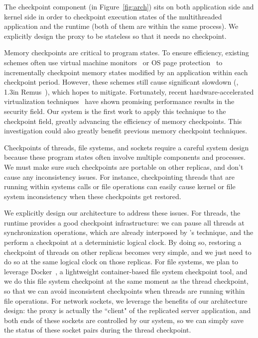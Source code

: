 The \crane checkpoint component (in Figure~\ref{fig:arch}) sits on both
application side and kernel side in order to checkpoint execution states of the
multithreaded application and the \smt runtime (both of them are within the
same process). We explicitly design the proxy to be stateless so that it needs
no checkpoint.

Memory checkpoints are critical to program states. To ensure efficiency,
existing schemes often use virtual machine monitors~\cite{remus:nsdi08} or OS
page protection~\cite{oren:atc07} to incrementally checkpoint memory states
modified by an application within each checkpoint period. However, these schemes
still cause significant slowdown (\eg, 1.3\times in Remus~\cite{remus:nsdi08}), which
\crane hopes to mitigate. Fortunately, recent hardware-accelerated
virtualization techniques~\cite{dune:osdi12} have shown promising performance
results in the security field. Our \crane system is the first work to apply this
technique to the checkpoint field, greatly advancing the efficiency of memory
checkpoints. This investigation could also greatly benefit previous memory
checkpoint techniques.

Checkpoints of threads, file systems, and sockets require a careful \crane
system design because these program states often involve multiple \crane
components and processes. We must make sure such checkpoints are portable on
other replicas, and don't cause any inconsistency issues. For instance,
checkpointing threads that are running within systems calls or file operations
can easily cause kernel or file system inconsistency when these checkpoints get
restored.

We explicitly design our \crane architecture to address these issues. For
threads, the \parrot \smt runtime provides a good checkpoint infrastructure: we
can pause all threads at synchronization operations, which are already
interposed by \parrot's \ldpreload technique, and the perform a checkpoint at a
deterministic logical clock. By doing so, restoring a checkpoint of threads on
other replicas becomes very simple, and we just need to do so at the same
logical clock on those replicas. For file systems, we plan to leverage
Docker~\cite{docker}, a lightweight container-based file system checkpoint tool,
and we do this file system checkpoint at the same moment as the thread
checkpoint, so that we can avoid inconsistent checkpoints when threads are
running within file operations. For network sockets, we leverage the benefits of
our architecture design: the proxy is actually the ``client" of the replicated
server application, and both ends of these sockets are controlled by our system,
so we can simply save the 
status of these socket pairs during the thread checkpoint.











